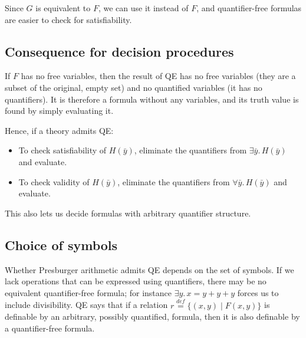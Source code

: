 Since $G$ is equivalent to $F$, we can use it instead of $F$, and quantifier-free formulas are easier to check for satisfiability.
 
\subsection*{Consequence for decision procedures}
 
If $F$ has no free variables, then the result of QE has no free variables (they are a subset of the original, empty set) and no quantified variables (it has no quantifiers). It is therefore a formula without any variables, and its truth value is found by simply evaluating it.
 
Hence, if a theory admits QE:
\begin{itemize}
  \item To check satisfiability of $H(\bar y)$, eliminate the quantifiers from $\exists \bar y.\, H(\bar y)$ and evaluate.
  \item To check validity of $H(\bar y)$, eliminate the quantifiers from $\forall \bar y.\, H(\bar y)$ and evaluate.
\end{itemize}
This also lets us decide formulas with arbitrary quantifier structure.
 
\subsection*{Choice of symbols}
 
Whether Presburger arithmetic admits QE depends on the set of symbols. If we lack operations that can be expressed using quantifiers, there may be no equivalent quantifier-free formula; for instance $\exists y.\, x = y + y + y$ forces us to include divisibility. QE says that if a relation $r \stackrel{\mathit{def}}{=} \{(x,y) \mid F(x,y)\}$ is definable by an arbitrary, possibly quantified, formula, then it is also definable by a quantifier-free formula.
 
 
